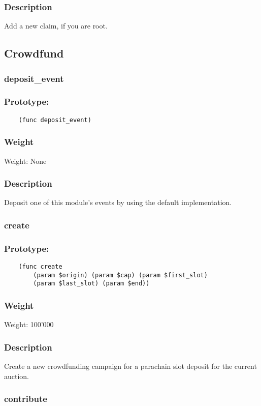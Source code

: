 \documentclass[11pt,a4paper]{article}
\begin{document}
\subsubsection*{Description}
Add a new claim, if you are root.

\subsection{Crowdfund}
\subsubsection{deposit\_event}
\subsubsection*{Prototype:}
\begin{verbatim}
    (func deposit_event)
\end{verbatim}
\subsubsection*{Weight}
Weight: None
\subsubsection*{Description}
Deposit one of this module's events by using the default implementation.

\subsubsection{create}
\subsubsection*{Prototype:}
\begin{verbatim}
    (func create 
        (param $origin) (param $cap) (param $first_slot)
        (param $last_slot) (param $end))
\end{verbatim}
\subsubsection*{Weight}
Weight: 100'000
\subsubsection*{Description}
Create a new crowdfunding campaign for a parachain slot deposit for the current auction. 

\subsubsection{contribute}
\end{document}
